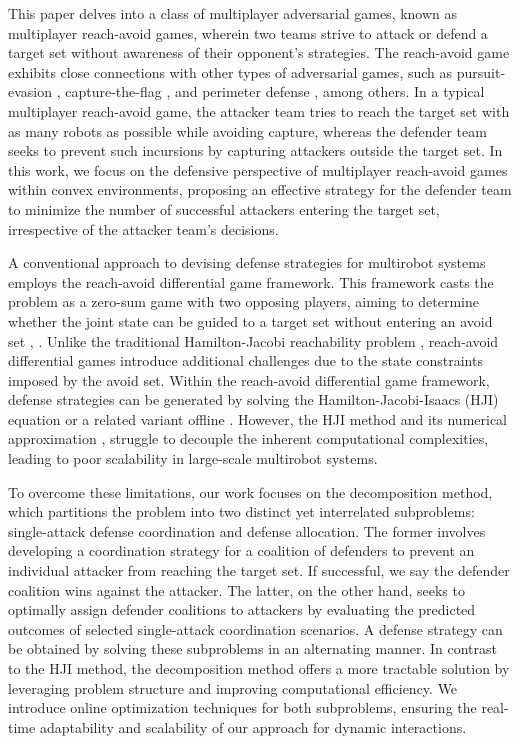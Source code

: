 \documentclass[journal]{IEEEtran}
\newcommand{\1}{\mathbf{1}}
\begin{document}
This paper delves into a class of multiplayer adversarial games, known as multiplayer reach-avoid games, wherein two teams strive to attack or defend a target set without awareness of their opponent's strategies. The reach-avoid game exhibits close connections with other types of adversarial games, such as pursuit-evasion \cite{chung2011search,bakolas2012relay,alexopoulos2015cooperative,de2021decentralized,zhang2022game}, capture-the-flag \cite{huang2011differential,garcia2018capture,jaderberg2019human}, and perimeter defense \cite{shishika2018local,guerrero2020perimeter,velhal2022decentralized}, among others. In a typical multiplayer reach-avoid game, the attacker team tries to reach the target set with as many robots as possible while avoiding capture, whereas the defender team seeks to prevent such incursions by capturing attackers outside the target set. In this work, we focus on the defensive perspective of multiplayer reach-avoid games within convex environments, proposing an effective strategy for the defender team to minimize the number of successful attackers entering the target set, irrespective of the attacker team's decisions. 

A conventional approach to devising defense strategies for multirobot systems employs the reach-avoid differential game framework. This framework casts the problem as a zero-sum game with two opposing players, aiming to determine whether the joint state can be guided to a target set without entering an avoid set \cite{margellos2011hamilton}, \cite{fisac2015reach}. Unlike the traditional Hamilton-Jacobi reachability problem \cite{mitchell2005time}, reach-avoid differential games introduce additional challenges due to the state constraints imposed by the avoid set. Within the reach-avoid differential game framework, defense strategies can be generated by solving the Hamilton-Jacobi-Isaacs (HJI) equation or a related variant offline \cite{bacsar1998dynamic}. However, the HJI method and its numerical approximation \cite{landry2018reach}, \cite{zhou2018efficient} struggle to decouple the inherent computational complexities, leading to poor scalability in large-scale multirobot systems.

To overcome these limitations, our work focuses on the decomposition method, which partitions the problem into two distinct yet interrelated subproblems: single-attack defense coordination and defense allocation. The former involves developing a coordination strategy for a coalition of defenders to prevent an individual attacker from reaching the target set. If successful, we say the defender coalition wins against the attacker. The latter, on the other hand, seeks to optimally assign defender coalitions to attackers by evaluating the predicted outcomes of selected single-attack coordination scenarios. A defense strategy can be obtained by solving these subproblems in an alternating manner. In contrast to the HJI method, the decomposition method offers a more tractable solution by leveraging problem structure and improving computational efficiency. We introduce online optimization techniques for both subproblems, ensuring the real-time adaptability and scalability of our approach for dynamic interactions.
\end{document}
